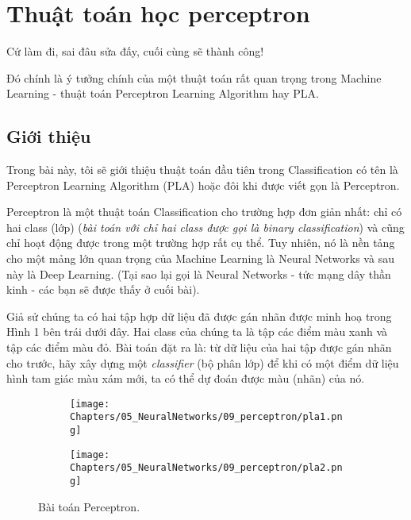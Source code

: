 \chapter{Thuật toán học perceptron}
\label{cha:pla}

Cứ làm đi, sai đâu sửa đấy, cuối cùng sẽ thành công! 
 
Đó chính là ý tưởng chính của một thuật toán rất quan trọng trong Machine Learning - thuật toán Perceptron Learning Algorithm hay PLA. 
 
 
 
 
\section{Giới thiệu}
 
Trong bài này, tôi sẽ giới thiệu thuật toán đầu tiên trong Classification có tên là Perceptron Learning Algorithm (PLA) hoặc đôi khi được viết gọn là Perceptron.  
 
Perceptron là một thuật toán Classification cho trường hợp đơn giản nhất: chỉ có hai class (lớp) (\textit{bài toán với chỉ hai class được gọi là binary classification}) và cũng chỉ hoạt động được trong một trường hợp rất cụ thể. Tuy nhiên, nó là nền tảng cho một mảng lớn quan trọng của Machine Learning là Neural Networks và sau này là Deep Learning. (Tại sao lại gọi là Neural Networks - tức mạng dây thần kinh - các bạn sẽ được thấy ở cuối bài). 
 
Giả sử chúng ta có hai tập hợp dữ liệu đã được gán nhãn được minh hoạ trong Hình 1 bên trái dưới đây. Hai class của chúng ta là tập các điểm màu xanh và tập các điểm màu đỏ. Bài toán đặt ra là: từ dữ liệu của hai tập được gán nhãn cho trước, hãy xây dựng một \textit{classifier} (bộ phân lớp) để khi có một điểm dữ liệu hình tam giác màu xám mới, ta có thể dự đoán được màu (nhãn) của nó.  
 

\begin{figure}[t]
     \begin{subfigure}{0.49\textwidth}
     \texttt{[image: Chapters/05\_NeuralNetworks/09\_perceptron/pla1.png]}
     \caption{}
     \end{subfigure}
     \begin{subfigure}{0.49\textwidth}
     \texttt{[image: Chapters/05\_NeuralNetworks/09\_perceptron/pla2.png]}
     \caption{}
     \end{subfigure}
     \caption{
      Bài toán Perceptron.
     }
     \label{fig:9_1}
 \end{figure}
  


